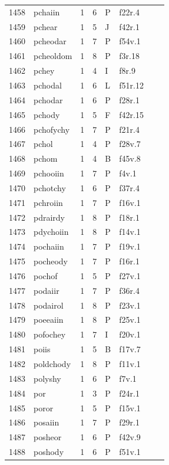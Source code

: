 \documentclass[11pt,a4paper]{article}
\begin{document}
\begin{landscape}
\begin{longtable}{@{}r>{\ttfamily}lrrl>{\ttfamily}l>{\raggedright\arraybackslash}p{80mm}>{\raggedright\arraybackslash}p{36mm}@{}}
1458 & pchaiin & 1 & 6 & P & f22r.4 &  & \\
1459 & pchear & 1 & 5 & J & f42r.1 &  & \\
1460 & pcheodar & 1 & 7 & P & f54v.1 &  & \\
1461 & pcheoldom & 1 & 8 & P & f3r.18 &  & \\
1462 & pchey & 1 & 4 & I & f8r.9 &  & \\
1463 & pchodal & 1 & 6 & L & f51r.12 &  & \\
1464 & pchodar & 1 & 6 & P & f28r.1 &  & \\
1465 & pchody & 1 & 5 & F & f42r.15 &  & \\
1466 & pchofychy & 1 & 7 & P & f21r.4 &  & \\
1467 & pchol & 1 & 4 & P & f28v.7 &  & \\
1468 & pchom & 1 & 4 & B & f45v.8 &  & \\
1469 & pchooiin & 1 & 7 & P & f4v.1 &  & \\
1470 & pchotchy & 1 & 6 & P & f37r.4 &  & \\
1471 & pchroiin & 1 & 7 & P & f16v.1 &  & \\
1472 & pdrairdy & 1 & 8 & P & f18r.1 &  & \\
1473 & pdychoiin & 1 & 8 & P & f14v.1 &  & \\
1474 & pochaiin & 1 & 7 & P & f19v.1 &  & \\
1475 & pocheody & 1 & 7 & P & f16r.1 &  & \\
1476 & pochof & 1 & 5 & P & f27v.1 &  & \\
1477 & podaiir & 1 & 7 & P & f36r.4 &  & \\
1478 & podairol & 1 & 8 & P & f23v.1 &  & \\
1479 & poeeaiin & 1 & 8 & P & f25v.1 &  & \\
1480 & pofochey & 1 & 7 & I & f20v.1 &  & \\
1481 & poiis & 1 & 5 & B & f17v.7 &  & \\
1482 & poldchody & 1 & 8 & P & f11v.1 &  & \\
1483 & polyshy & 1 & 6 & P & f7v.1 &  & \\
1484 & por & 1 & 3 & P & f24r.1 &  & \\
1485 & poror & 1 & 5 & P & f15v.1 &  & \\
1486 & posaiin & 1 & 7 & P & f29r.1 &  & \\
1487 & posheor & 1 & 6 & P & f42v.9 &  & \\
1488 & poshody & 1 & 6 & P & f51v.1 &  & \\

\end{longtable}
\end{landscape}
\end{document}
